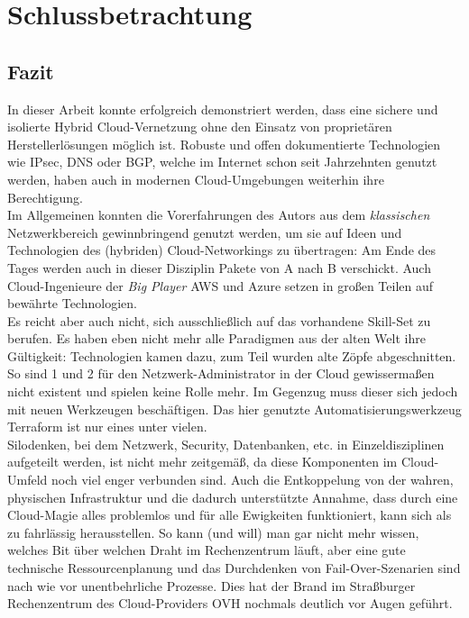 \chapter{Schlussbetrachtung} \label{Fazit und Ausblick}
\section{Fazit}

In dieser Arbeit konnte erfolgreich demonstriert werden, dass eine sichere und isolierte Hybrid Cloud-Vernetzung ohne den Einsatz von proprietären Herstellerlösungen möglich ist. Robuste und offen dokumentierte Technologien wie \gls{IPsec}, \gls{DNS} oder \gls{BGP}, welche im Internet schon seit Jahrzehnten genutzt werden, haben auch in \glqq modernen\grqq{} Cloud-Umgebungen weiterhin ihre Berechtigung.\\
Im Allgemeinen konnten die Vorerfahrungen des Autors aus dem \textit{klassischen} Netzwerkbereich gewinnbringend genutzt werden, um sie auf Ideen und Technologien des (hybriden) Cloud-Networkings zu übertragen: Am Ende des Tages werden auch in dieser Disziplin Pakete von A nach B verschickt. Auch Cloud-Ingenieure der \textit{Big Player} AWS und Azure setzen in großen Teilen auf bewährte Technologien.\\
Es reicht aber auch nicht, sich ausschließlich auf das vorhandene Skill-Set zu berufen. Es haben eben nicht mehr alle Paradigmen aus der \glqq alten Welt\grqq{} ihre Gültigkeit: Technologien kamen dazu, zum Teil wurden alte Zöpfe abgeschnitten. So sind  1 und 2 für den Netzwerk-Administrator in der Cloud gewissermaßen nicht existent und spielen keine Rolle mehr. Im Gegenzug muss dieser sich jedoch mit neuen Werkzeugen beschäftigen. Das hier genutzte Automatisierungswerkzeug Terraform ist nur eines unter vielen.\\
Silodenken, bei dem Netzwerk, Security, Datenbanken, etc. in Einzeldisziplinen aufgeteilt werden, ist nicht mehr zeitgemäß, da diese Komponenten im Cloud-Umfeld noch viel enger verbunden sind. Auch die Entkoppelung von der \glqq wahren\grqq{}, physischen Infrastruktur und die dadurch unterstützte Annahme, dass durch eine \glqq Cloud-Magie\grqq{} alles problemlos und für alle Ewigkeiten funktioniert, kann sich als zu fahrlässig herausstellen. So kann (und will) man gar nicht mehr wissen, \glqq welches Bit über welchen Draht im Rechenzentrum läuft\grqq{}, aber eine gute technische Ressourcenplanung und das Durchdenken von Fail-Over-Szenarien sind nach wie vor unentbehrliche Prozesse. Dies hat der Brand im Straßburger Rechenzentrum des Cloud-Providers OVH nochmals deutlich vor Augen geführt\cite{ChristofKerkmann2021}.\\
